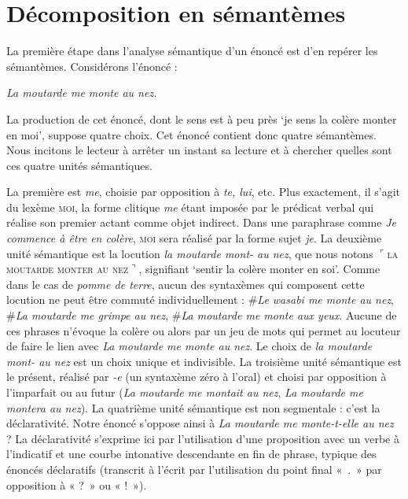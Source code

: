 \section{Décomposition en sémantèmes}\label{sec:2.3.5}

La première étape dans l’analyse sémantique d’un énoncé est d’en repérer les sémantèmes. Considérons l’énoncé :

\ea\itshape La moutarde me monte au nez.\z

La production de cet énoncé, dont le sens est à peu près ‘je sens la colère monter en moi’, suppose quatre choix. Cet énoncé contient donc quatre sémantèmes. Nous incitons le lecteur à arrêter un instant sa lecture et à chercher quelles sont ces quatre unités sémantiques.

La première est \textit{me}, choisie par opposition à \textit{te, lui}, etc. Plus exactement, il s’agit du lexème \textsc{moi}, la forme clitique \textit{me} étant imposée par le prédicat verbal qui réalise son premier actant comme objet indirect. Dans une paraphrase comme \textit{Je commence à être en colère}, \textsc{moi} sera réalisé par la forme sujet \textit{je}. La deuxième unité sémantique est la locution \textit{la moutarde mont- au nez}, que nous notons $⌜$\textsc{la} \textsc{moutarde} \textsc{monter} \textsc{au} \textsc{nez}$⌝$, signifiant ‘sentir la colère monter en soi’. Comme dans le cas de \textit{pomme de terre}, aucun des syntaxèmes qui composent cette locution ne peut être commuté individuellement : \#\textit{Le wasabi me monte au nez}, \#\textit{La moutarde me grimpe au nez}, \#\textit{La moutarde me monte aux yeux}. Aucune de ces phrases n’évoque la colère ou alors par un jeu de mots qui permet au locuteur de faire le lien avec \textit{La moutarde me monte au nez}. Le choix de \textit{la moutarde mont- au nez} est un choix unique et indivisible. La troisième unité sémantique est le présent, réalisé par \textit{{}-e} (un syntaxème zéro à l’oral) et choisi par opposition à l’imparfait ou au futur (\textit{La moutarde me montait au nez}, \textit{La moutarde me montera au nez}). La quatrième unité sémantique est non segmentale : c’est la déclarativité. Notre énoncé s’oppose ainsi à \textit{La moutarde me monte-t-elle au nez} ? La déclarativité s’exprime ici par l’utilisation d’une proposition avec un verbe à l’indicatif et une courbe intonative descendante en fin de phrase, typique des énoncés déclaratifs (transcrit à l’écrit par l’utilisation du point final «~.~» par opposition à « ?~» ou « !~»).\largerpage[-1]

